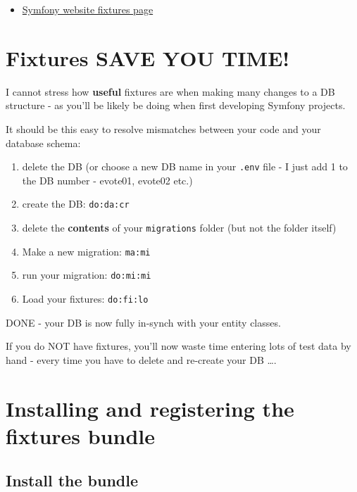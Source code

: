\documentclass[a4paperpaper,openright]{book}
\providecommand{\tightlist}{%
  \setlength{\itemsep}{0pt}\setlength{\parskip}{0pt}}
\begin{document}
\begin{itemize}
\tightlist
\item
  \href{https://symfony.com/doc/master/bundles/DoctrineFixturesBundle/index.html}{Symfony
  website fixtures page}
\end{itemize}

\hypertarget{fixtures-save-you-time}{%
\section{Fixtures SAVE YOU TIME!}\label{fixtures-save-you-time}}

I cannot stress how \textbf{useful} fixtures are when making many
changes to a DB structure - as you'll be likely be doing when first
developing Symfony projects.

It should be this easy to resolve mismatches between your code and your
database schema:

\begin{enumerate}
\def\labelenumi{\arabic{enumi}.}
\tightlist
\item
  delete the DB (or choose a new DB name in your \texttt{.env} file - I
  just add 1 to the DB number - evote01, evote02 etc.)
\item
  create the DB: \texttt{do:da:cr}
\item
  delete the \textbf{contents} of your \texttt{migrations} folder (but
  not the folder itself)
\item
  Make a new migration: \texttt{ma:mi}
\item
  run your migration: \texttt{do:mi:mi}
\item
  Load your fixtures: \texttt{do:fi:lo}
\end{enumerate}

DONE - your DB is now fully in-synch with your entity classes.

If you do NOT have fixtures, you'll now waste time entering lots of test
data by hand - every time you have to delete and re-create your DB
\ldots{}.

\hypertarget{installing-and-registering-the-fixtures-bundle}{%
\section{Installing and registering the fixtures
bundle}\label{installing-and-registering-the-fixtures-bundle}}

\hypertarget{install-the-bundle}{%
\subsection{Install the bundle}\label{install-the-bundle}}
\end{document}

